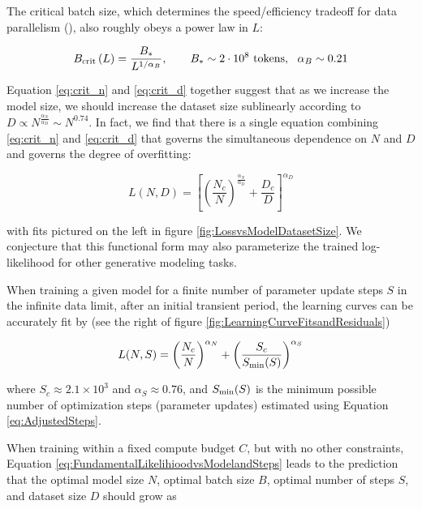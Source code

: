 The critical batch size, which determines the speed/efficiency tradeoff for data parallelism (\cite{1812.06162}), also roughly obeys a power law in $L$:

\begin{equation}
B_{\rm crit}\left(L\right)=\frac{B_{\ast}}{L^{1/\alpha_{B}}},\qquad B_{\ast} \sim 2\cdot 10^8 \text{ tokens},\ \ \alpha_{B} \sim 0.21
\label{eq:critical-batch-size}
\end{equation}

Equation \eqref{eq:crit_n} and \eqref{eq:crit_d} together suggest that as we increase the model size, we should increase the dataset size sublinearly according to $D \propto N^{\frac{\alpha_N}{\alpha_D}} \sim N^{0.74}$. In fact, we find that there is a single equation combining \eqref{eq:crit_n} and \eqref{eq:crit_d} that governs the simultaneous dependence on $N$ and $D$ and governs the degree of overfitting:

\begin{equation}
\label{eq:FundamentalLikelihioodvsModelandDataSize}
L(N, D) 
= \left[ \left( \frac{N_c}{N} \right)^{\frac{\alpha_N}{\alpha_D}} + \frac{D_c}{D}  \right]^{\alpha_D}
\end{equation}

with fits pictured on the left in figure \ref{fig:LossvsModelDatasetSize}.  We conjecture that this functional form may also parameterize the trained log-likelihood for other generative modeling tasks.

When training a given model for a finite number of parameter update steps $S$ in the infinite data limit, after an initial transient period, the learning curves can be accurately fit by  (see the right of figure \ref{fig:LearningCurveFitsandResiduals})

\begin{equation}
\label{eq:FundamentalLikelihioodvsModelandSteps}
L(N, S) = \left( \frac{N_c}{N} \right)^{\alpha_N}  + \left( \frac{S_c }{S_{\rm min}(S)} \right)^{\alpha_S}
\end{equation}

where $S_c \approx 2.1 \times 10^3$ and $\alpha_S \approx 0.76$, and $S_{\rm min}(S)$ is the minimum possible number of optimization steps (parameter updates) estimated  using Equation \eqref{eq:AdjustedSteps}.

When training within a fixed compute budget $C$, but with no other constraints, Equation \eqref{eq:FundamentalLikelihioodvsModelandSteps} leads to the prediction that the optimal model size $N$, optimal batch size $B$, optimal number of steps $S$, and dataset size $D$ should grow as

